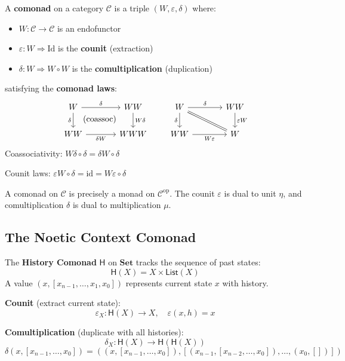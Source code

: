 \begin{definition}[Comonad]
\label{def:comonad}
A \textbf{comonad} on a category $\mathcal{C}$ is a triple $(W, \varepsilon, \delta)$ where:
\begin{itemize}
  \item $W : \mathcal{C} \to \mathcal{C}$ is an endofunctor
  \item $\varepsilon : W \Rightarrow \mathrm{Id}$ is the \textbf{counit} (extraction)
  \item $\delta : W \Rightarrow W \circ W$ is the \textbf{comultiplication} (duplication)
\end{itemize}
satisfying the \textbf{comonad laws}:
\[
\begin{tikzcd}[column sep=large]
  W \arrow[r, "\delta"] \arrow[d, "\delta"'] \arrow[dr, phantom, "\text{(coassoc)}"]
  & WW \arrow[d, "W\delta"] \\
  WW \arrow[r, "\delta W"']
  & WWW
\end{tikzcd}
\qquad
\begin{tikzcd}[column sep=large]
  W \arrow[r, "\delta"] \arrow[dr, equal] \arrow[d, "\delta"']
  & WW \arrow[d, "\varepsilon W"] \\
  WW \arrow[r, "W\varepsilon"']
  & W
\end{tikzcd}
\]
Coassociativity: $W\delta \circ \delta = \delta W \circ \delta$

Counit laws: $\varepsilon W \circ \delta = \mathrm{id} = W\varepsilon \circ \delta$
\end{definition}

\begin{remark}
\label{rem:comonad-dual}
A comonad on $\mathcal{C}$ is precisely a monad on $\mathcal{C}^{\mathrm{op}}$. The counit
$\varepsilon$ is dual to unit $\eta$, and comultiplication $\delta$ is dual to
multiplication $\mu$.
\end{remark}

\subsection{The Noetic Context Comonad}
\label{subsec:noetic-context-comonad}

\begin{definition}
\label{def:history-comonad}
The \textbf{History Comonad} $\mathsf{H}$ on $\mathbf{Set}$ tracks the sequence of
past states:
\[
  \mathsf{H}(X) = X \times \mathsf{List}(X)
\]
A value $(x, [x_{n-1}, \ldots, x_1, x_0])$ represents current state $x$ with history.

\textbf{Counit} (extract current state):
\[
  \varepsilon_X : \mathsf{H}(X) \to X, \quad \varepsilon(x, h) = x
\]

\textbf{Comultiplication} (duplicate with all histories):
\[
  \delta_X : \mathsf{H}(X) \to \mathsf{H}(\mathsf{H}(X))
\]
\[
  \delta(x, [x_{n-1}, \ldots, x_0]) = ((x, [x_{n-1}, \ldots, x_0]), [(x_{n-1}, [x_{n-2}, \ldots, x_0]), \ldots, (x_0, [])])
\]
\end{definition}

